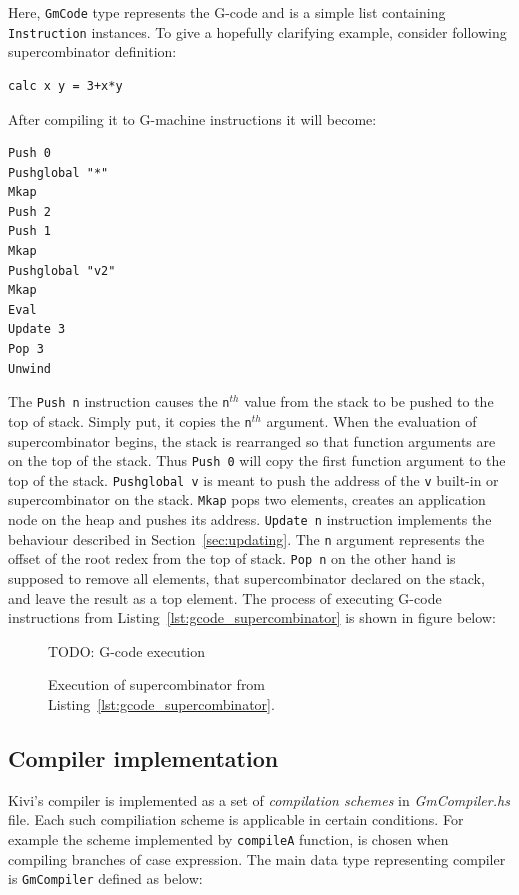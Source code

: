 \documentclass[12pt,a4paper]{report}
\begin{document}
Here, \texttt{GmCode} type represents the G-code and is a simple list containing
\texttt{Instruction} instances. To give a hopefully clarifying example,
consider following supercombinator definition:

\vspace*{0.2in}
\begin{lstlisting}[style=haskell,label=lst:sc_to_compile,caption=Supercombinator to compile.]
calc x y = 3+x*y
\end{lstlisting}

After compiling it to G-machine instructions it will become:

\vspace*{0.2in}
\begin{lstlisting}[style=haskell,label=lst:gcode_supercombinator,caption={Compiled
  supercombinator body.}]
Push 0
Pushglobal "*"
Mkap
Push 2
Push 1
Mkap
Pushglobal "v2"
Mkap
Eval
Update 3
Pop 3
Unwind
\end{lstlisting}

The \texttt{Push n} instruction causes the \texttt{n}$^{th}$ value from the
stack to be pushed to the top of stack. Simply put, it copies the
\texttt{n}$^{th}$ argument. When the evaluation of supercombinator begins, the
stack is rearranged so that function arguments are on the top of the stack.
Thus \texttt{Push 0} will copy the first function argument to the top of the
stack. \texttt{Pushglobal v} is meant to push the address of the \texttt{v}
built-in or supercombinator on the stack. \texttt{Mkap} pops two elements,
creates an application node on the heap and pushes its address. \texttt{Update
n} instruction implements the behaviour described in
Section~\ref{sec:updating}. The \texttt{n} argument represents the offset of
the root redex from the top of stack. \texttt{Pop n} on the other hand is
supposed to remove all elements, that supercombinator declared on the stack,
and leave the result as a top element. The process of executing G-code
instructions from Listing~\ref{lst:gcode_supercombinator} is shown in figure
below:

\begin{figure}[h!]
  \centering

  TODO: G-code execution

  \caption{Execution of supercombinator from Listing~\ref{lst:gcode_supercombinator}.}
  \label{fig:gcode_execution}
\end{figure}

\subsection{Compiler implementation}
Kivi's compiler is implemented as a set of \textit{compilation schemes} in
\textit{GmCompiler.hs} file. Each such compiliation scheme is applicable in
certain conditions. For example the scheme implemented by \texttt{compileA}
function, is chosen when compiling branches of case expression. The main data
type representing compiler is \texttt{GmCompiler} defined as below:
\end{document}
